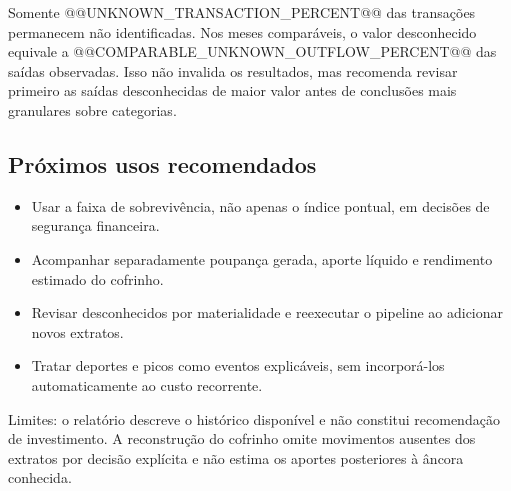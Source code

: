 \documentclass[11pt,a4paper]{article}
\newcommand{\Callout}[1]{%
  \colorbox{PaleOrange}{%
    \begin{minipage}{0.925\textwidth}
      \vspace{2mm}\small #1\vspace{2mm}
    \end{minipage}%
  }\par%
}
\begin{document}
Somente @@UNKNOWN_TRANSACTION_PERCENT@@ das transações permanecem não identificadas. Nos meses comparáveis, o valor desconhecido equivale a @@COMPARABLE_UNKNOWN_OUTFLOW_PERCENT@@ das saídas observadas. Isso não invalida os resultados, mas recomenda revisar primeiro as saídas desconhecidas de maior valor antes de conclusões mais granulares sobre categorias.

\subsection{Próximos usos recomendados}

\begin{itemize}
  \item Usar a faixa de sobrevivência, não apenas o índice pontual, em decisões de segurança financeira.
  \item Acompanhar separadamente poupança gerada, aporte líquido e rendimento estimado do cofrinho.
  \item Revisar desconhecidos por materialidade e reexecutar o pipeline ao adicionar novos extratos.
  \item Tratar deportes e picos como eventos explicáveis, sem incorporá-los automaticamente ao custo recorrente.
\end{itemize}

\Callout{Limites: o relatório descreve o histórico disponível e não constitui recomendação de investimento. A reconstrução do cofrinho omite movimentos ausentes dos extratos por decisão explícita e não estima os aportes posteriores à âncora conhecida.}
\end{document}
